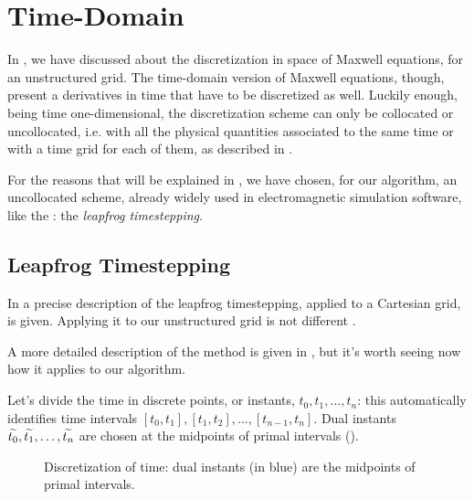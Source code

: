 \chapter{Time-Domain} \label{cha:time_domain}

In , we have discussed about the
discretization in space of Maxwell equations, for an unstructured
grid. The time-domain version of Maxwell equations, though, present a
derivatives in time that have to be discretized as well. Luckily
enough, being time one-dimensional, the discretization scheme can only
be collocated or uncollocated, i.e. with all the physical quantities
associated to the same time or with a time grid for each of them, as
described in .

For the reasons that will be explained in ,
we have chosen, for our algorithm, an uncollocated scheme, already
widely used in electromagnetic simulation software, like the \FDTD: the
\emph{leapfrog timestepping}.

\section{Leapfrog Timestepping}  \label{sec:leapfrog}

In \cite{taflove_computational} a precise description of the leapfrog
timestepping, applied to a Cartesian grid, is given. Applying it to
our unstructured grid is not different \cite{bolla_piers}.

A more detailed description of the method is given in
, but it's worth seeing now how it applies to
our algorithm.

Let's divide the time in discrete points, or instants, $t_0, t_1, \dotsc, t_n$:
this automatically identifies time intervals
$[t_0,t_1],[t_1,t_2],\dotsc,[t_{n-1},t_n]$. Dual instants
$\widetilde{t_0},\widetilde{t_1},\dotsc,\widetilde{t_n}$ are chosen
at the midpoints of primal intervals ().

\begin{figure}[htbp]
  \begin{center}
    \resizebox{8cm}{!}{}
  \end{center}
  \caption{Discretization of time: dual instants (in blue) are the
    midpoints of primal intervals.}  
  \label{fig:timeline}
\end{figure}

